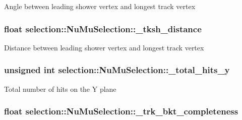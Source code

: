 Angle between leading shower vertex and longest track vertex \hypertarget{classselection_1_1NuMuSelection_a046903808fefc33bee41d19b1f6a96de}{
\subsubsection[{\-\_\-tksh\-\_\-distance}]{\setlength{\rightskip}{0pt plus 5cm}float selection\-::\-Nu\-Mu\-Selection\-::\-\_\-tksh\-\_\-distance\hspace{0.3cm}{\ttfamily [private]}}}\label{classselection_1_1NuMuSelection_a046903808fefc33bee41d19b1f6a96de}
Distance between leading shower vertex and longest track vertex \hypertarget{classselection_1_1NuMuSelection_a6c1ae5a457aa2734684c6632abf34a8c}{
\subsubsection[{\-\_\-total\-\_\-hits\-\_\-y}]{\setlength{\rightskip}{0pt plus 5cm}unsigned int selection\-::\-Nu\-Mu\-Selection\-::\-\_\-total\-\_\-hits\-\_\-y\hspace{0.3cm}{\ttfamily [private]}}}\label{classselection_1_1NuMuSelection_a6c1ae5a457aa2734684c6632abf34a8c}
Total number of hits on the Y plane \hypertarget{classselection_1_1NuMuSelection_a569e5b1199f57a2becbd28ee0202baae}{
\subsubsection[{\-\_\-trk\-\_\-bkt\-\_\-completeness}]{\setlength{\rightskip}{0pt plus 5cm}float selection\-::\-Nu\-Mu\-Selection\-::\-\_\-trk\-\_\-bkt\-\_\-completeness\hspace{0.3cm}{\ttfamily [private]}}}\label{classselection_1_1NuMuSelection_a569e5b1199f57a2becbd28ee0202baae}
